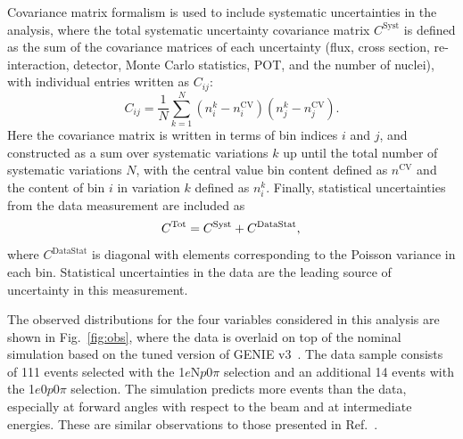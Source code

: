 \documentclass[reprint,
 amsmath,amssymb,
 aps,prd,
 superscriptaddress,
 twocolumn, longbibliography
]{revtex4-1}
\newcommand{\npsel}{1$e$N$p$0$\pi$\xspace}
\newcommand{\zpsel}{1$e$0$p$0$\pi$\xspace}
\begin{document}
Covariance matrix formalism is used to include systematic uncertainties in the analysis, where the total systematic uncertainty covariance matrix $C^{\textrm{Syst}}$ is defined as the sum of the covariance matrices of each uncertainty (flux, cross section, re-interaction, detector, Monte Carlo statistics, POT, and the number of nuclei), with individual entries written as $C_{ij}$:
\begin{equation}
    C_{ij} = \frac{1}{N}\sum_{k=1}^{N} \left(n_i^{k} - n_i^{\textrm{CV}}\right)\left(n_j^{k} - n_j^\textrm{CV}\right).
\end{equation}
Here the covariance matrix is written in terms of bin indices $i$ and $j$, and constructed as a sum over systematic variations $k$ up until the total number of systematic variations $N$, with the central value bin content defined as $n^{\textrm{CV}}$ and the content of bin $i$ in variation $k$ defined as $n^{k}_{i}$.
Finally, statistical uncertainties from the data measurement are included as 
\begin{equation}\label{eq:totcov}
        C^\textrm{Tot} = C^\textrm{Syst} + C^\textrm{DataStat}, \\
\end{equation}
where $C^\textrm{DataStat}$ is diagonal with elements corresponding to the Poisson variance in each bin. Statistical uncertainties in the data are the leading source of uncertainty in this measurement.

The observed distributions for the four variables considered in this analysis are shown in Fig.~\ref{fig:obs}, where the data is overlaid on top of the nominal simulation based on the tuned version of GENIE v3~\cite{ubtune}. The data sample consists of 111 events selected with the \npsel selection and an additional 14 events with the \zpsel selection. The simulation predicts more events than the data, especially at forward angles with respect to the beam and at intermediate energies. These are similar observations to those presented in Ref.~\cite{PeLEE}.
\end{document}
